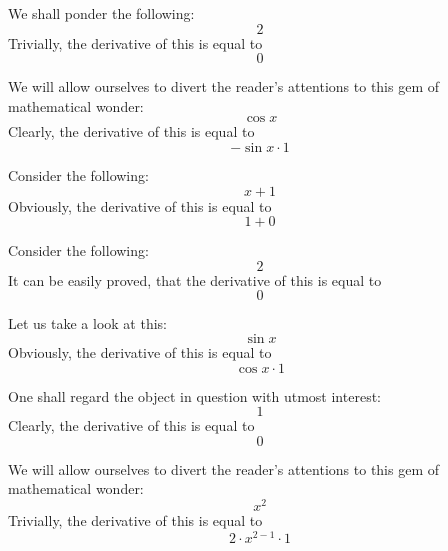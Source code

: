 \documentclass{article}
\begin{document}
We shall ponder the following:
\begin{equation}
2 
\end{equation}
Trivially, the derivative of this is equal to
\begin{equation}
0 
\end{equation}

We will allow ourselves to divert the reader's attentions to this gem of mathematical wonder:
\begin{equation}
\cos x 
\end{equation}
Clearly, the derivative of this is equal to
\begin{equation}
-\sin x \cdot 1 
\end{equation}

Consider the following:
\begin{equation}
x + 1 
\end{equation}
Obviously, the derivative of this is equal to
\begin{equation}
1 + 0 
\end{equation}

Consider the following:
\begin{equation}
2 
\end{equation}
It can be easily proved, that the derivative of this is equal to
\begin{equation}
0 
\end{equation}

Let us take a look at this:
\begin{equation}
\sin x 
\end{equation}
Obviously, the derivative of this is equal to
\begin{equation}
\cos x \cdot 1 
\end{equation}

One shall regard the object in question with utmost interest:
\begin{equation}
1 
\end{equation}
Clearly, the derivative of this is equal to
\begin{equation}
0 
\end{equation}

We will allow ourselves to divert the reader's attentions to this gem of mathematical wonder:
\begin{equation}
x ^{2 } 
\end{equation}
Trivially, the derivative of this is equal to
\begin{equation}
2 \cdot x ^{2 - 1 } \cdot 1 
\end{equation}
\end{document}
